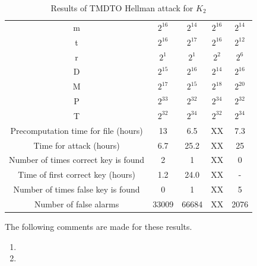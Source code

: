 \begin{table}[ht!]
\begin{center}
\begin{tabular}{|c||c|c|c|c|}
\hline
m																				&	$2^{16}$ 	&	$2^{14}$ 	&	$2^{16}$ 	&	$2^{14}$ 	\\ 
t	  																		&	$2^{16}$ 	&	$2^{17}$ 	&	$2^{16}$ 	&	$2^{12}$	\\ 
r	  																		&	$2^{1}$ 	&	$2^{1}$ 	&	$2^{2}$ 	&	$2^{6}$		\\ 
D	  																		&	$2^{15}$ 	&	$2^{16}$ 	&	$2^{14}$ 	&	$2^{16}$	\\ \hline \hline
M																				&	$2^{17}$ 	&	$2^{15}$ 	&	$2^{18}$ 	&	$2^{20}$ 	\\ 
P	  																		&	$2^{33}$ 	&	$2^{32}$ 	&	$2^{34}$ 	&	$2^{32}$	\\ 
T	  																		&	$2^{32}$ 	&	$2^{34}$ 	&	$2^{32}$ 	&	$2^{34}$	\\ \hline \hline
Precomputation time for file (hours)		&	13 	 			&	6.5 			&	XX				&	7.3				\\ \hline
Time for attack	(hours)									&	6.7 			&	25.2			&	XX 			 	&	25	 			\\ \hline
Number of times correct key is found 		&	2 				&	1					&	XX 				&	0 				\\ \hline
Time of first correct key (hours)				&	1.2 			&	24.0			&	XX	 		 	&	-		 			\\ \hline
Number of times false key is found			&	0 				&	1 				&	XX				&	5					\\ \hline
Number of false alarms									&	33009			&	66684			&	XX				&	2076			\\ \hline
\end{tabular}
\end{center}
\caption{Results of TMDTO Hellman attack for $K_2$}
\label{tab:hellman-attack-results}
\end{table}

The following comments are made for these results.
\begin{enumerate}
\item 
\item 
\end{enumerate}